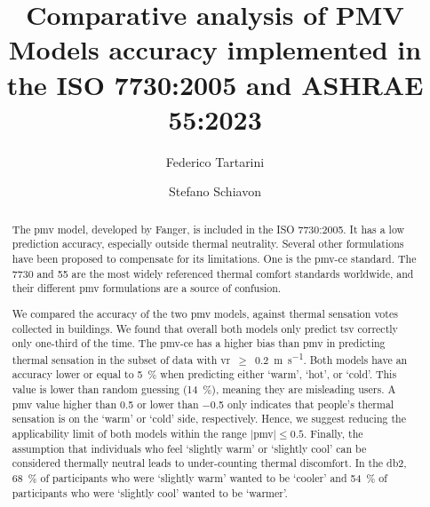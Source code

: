 \begin{frontmatter}

    \title{Comparative analysis of PMV Models accuracy implemented in the ISO 7730:2005 and ASHRAE 55:2023}

    \author[label1]{Federico Tartarini}
    \author[label3]{Stefano Schiavon}

    \address[label1]{School of Architecture, Design, and Planning, The University of Sydney, Sydney, AU}
    \address[label3]{Center for the Built Environment, Department of Architecture, Department of Civil and Environmental Engineering, University of California, Berkeley, CA, USA}


    \begin{abstract}
        The \ac{pmv} model, developed by Fanger, is included in the ISO 7730:2005.
        It has a low prediction accuracy, especially outside thermal neutrality.
        Several other formulations have been proposed to compensate for its limitations.
        One is the \ac{pmv-ce} standard.
        The \gls{7730} and \gls{55} are the most widely referenced thermal comfort standards worldwide, and their different \ac{pmv} formulations are a source of confusion.

        We compared the accuracy of the two \ac{pmv} models, against  thermal sensation votes collected in buildings.
        We found that overall both models only predict \ac{tsv} correctly only one-third of the time.
        The \ac{pmv-ce} has a higher bias than \ac{pmv} in predicting thermal sensation in the subset of data with \acl{vr}~$\geq$~\qty{0.2}{\m\per\s}.
        Both models have an accuracy lower or equal to \qty{5}{\percent} when predicting either `warm', `hot', or `cold'.
        This value is lower than random guessing (\qty{14}{\percent}), meaning they are misleading users.
        A \ac{pmv} value higher than \num{.5} or lower than \num{-.5} only indicates that people's thermal sensation is on the `warm' or `cold' side, respectively.
        Hence, we suggest reducing the applicability limit of both models within the range $\mid$\ac{pmv}$\mid \leq 0.5$.
        Finally, the assumption that individuals who feel `slightly warm' or `slightly cool' can be considered thermally neutral leads to under-counting thermal discomfort.
        In the \acl{db2}, \qty{68}{\percent} of participants who were `slightly warm' wanted to be `cooler' and \qty{54}{\percent} of participants who were `slightly cool' wanted to be `warmer'.
    \end{abstract}


\end{frontmatter}
